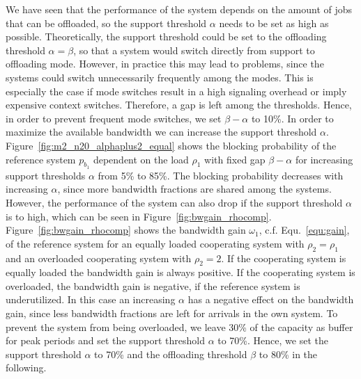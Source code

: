 We have seen that the performance of the system depends on the amount of jobs that can be offloaded, so the support threshold $\alpha$ needs to be set as high as possible. Theoretically, the support threshold could be set to the offloading threshold $\alpha=\beta$, so that a system would switch directly from support to offloading mode. However, in practice this may lead to problems, since the systems could switch unnecessarily frequently among the modes. This is especially the case if mode switches result in a high signaling overhead or imply expensive context switches. Therefore, a gap is left among the thresholds.
Hence, in order to prevent frequent mode switches, we set $\beta - \alpha$ to 10\%. In order to maximize the available bandwidth we can increase the support threshold $\alpha$.
Figure~\ref{fig:m2_n20_alphaplus2_equal} shows the blocking probability of the reference system $p_{b_1}$ dependent on the load $\rho_1$ with fixed gap $\beta-\alpha$ for increasing support thresholds $\alpha$ from 5\% to 85\%. The blocking probability decreases with increasing $\alpha$, since more bandwidth fractions are shared among the systems.
However, the performance of the system can also drop if the support threshold $\alpha$ is to high, which can be seen in Figure~\ref{fig:bwgain_rhocomp}. Figure~\ref{fig:bwgain_rhocomp} shows the bandwidth gain $\omega_1$, c.f. Equ.~\ref{equ:gain}, of the reference system for an equally loaded cooperating system with $\rho_2=\rho_1$ and an overloaded cooperating system with $\rho_2=2$. If the cooperating system is equally loaded the bandwidth gain is always positive. If the cooperating system is overloaded, the bandwidth gain is negative, if the reference system is underutilized. In this case an increasing $\alpha$ has a negative effect on the bandwidth gain, since less bandwidth fractions are left for arrivals in the own system.
To prevent the system from being overloaded, we leave 30\% of the capacity as buffer for peak periods and set the support threshold $\alpha$ to 70\%.
Hence, we set the support threshold $\alpha$ to 70\% and the offloading threshold $\beta$ to 80\% in the following.

